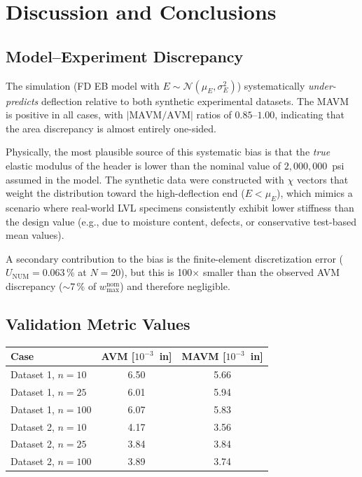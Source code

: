 \documentclass[11pt,letterpaper]{article}
\newcommand{\UNUM}{U_{\mathrm{NUM}}}
\newcommand{\AVM}{\mathrm{AVM}}
\newcommand{\MAVM}{\mathrm{MAVM}}
\newcommand{\wmax}{w_{\max}}
\newcommand{\muE}{\mu_E}
\newcommand{\sigE}{\sigma_E}
\begin{document}
\section{Discussion and Conclusions}
\label{sec:conclusions}

\subsection*{Model--Experiment Discrepancy}

The simulation (FD EB model with $E \sim \mathcal{N}(\muE, \sigE^2)$) systematically
\emph{under-predicts} deflection relative to both synthetic experimental datasets.
The MAVM is positive in all cases, with $|\MAVM/\AVM|$ ratios of $0.85$--$1.00$,
indicating that the area discrepancy is almost entirely one-sided.

Physically, the most plausible source of this systematic bias is that the
\emph{true} elastic modulus of the header is lower than the nominal value of
$2{,}000{,}000$~psi assumed in the model.  The synthetic data were constructed with
$\chi$ vectors that weight the distribution toward the high-deflection end
($E < \muE$), which mimics a scenario where real-world LVL specimens consistently
exhibit lower stiffness than the design value (e.g., due to moisture content,
defects, or conservative test-based mean values).

A secondary contribution to the bias is the finite-element discretization error
($\UNUM = 0.063\,\%$ at $N=20$), but this is 100$\times$ smaller than the
observed AVM discrepancy ($\sim\!7\,\%$ of $\wmax^{\mathrm{nom}}$) and therefore
negligible.

\subsection*{Validation Metric Values}

\begin{center}
\begin{tabular}{lcc}
  \toprule
  Case & AVM  [$10^{-3}$~in] & MAVM [$10^{-3}$~in] \\
  \midrule
  Dataset 1, $n=10$  & 6.50 & 5.66 \\
  Dataset 1, $n=25$  & 6.01 & 5.94 \\
  Dataset 1, $n=100$ & 6.07 & 5.83 \\[3pt]
  Dataset 2, $n=10$  & 4.17 & 3.56 \\
  Dataset 2, $n=25$  & 3.84 & 3.84 \\
  Dataset 2, $n=100$ & 3.89 & 3.74 \\
  \bottomrule
\end{tabular}
\end{center}
\end{document}
